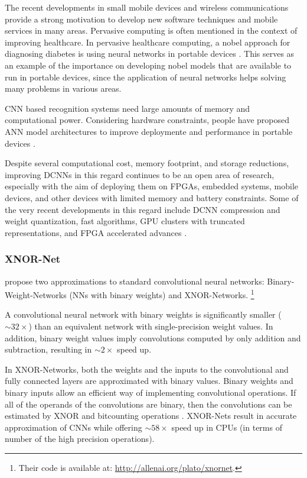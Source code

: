 The recent developments in small mobile devices and wireless communications
provide a strong motivation to develop new software techniques and mobile
services in many areas. Pervasive computing is often mentioned in the
context of improving healthcare. In pervasive healthcare computing, a nobel
approach for diagnosing diabetes is using neural networks in portable devices
\citep{Karan2012}. This serves as an example of the importance on developing
nobel models that are available to run in portable devices, since the
application of neural networks helps solving many problems in various areas.

CNN based recognition systems need large amounts of memory and computational
power. Considering hardware constraints, people have proposed ANN model
architectures to improve deploymente and performance in portable devices
\citep{Rastegari2016, Wu2016, Kim2015}.

{\color{Orchid}
Despite several computational cost, memory footprint, and
storage reductions, improving DCNNs in this regard continues to be an open
area of research, especially with the aim of deploying them on FPGAs,
embedded systems, mobile devices, and other devices with limited memory and
battery constraints. Some of the very recent developments in this regard
include DCNN compression and weight quantization, fast algorithms, GPU
clusters with truncated representations, and FPGA accelerated advances
\citep{Waseem2017}.}


\subsubsection{XNOR-Net}

\cite{Rastegari2016} propose two approximations to standard convolutional
neural networks: Binary-Weight-Networks (NNs with binary weights) and
XNOR-Networks. \footnote{Their code is available at:
\url{http://allenai.org/plato/xnornet}.}

A convolutional neural network with binary weights is
significantly smaller ($\sim 32 \times$) than an equivalent network
with single-precision weight values. In addition, binary weight values imply
convolutions computed by only addition and subtraction, resulting in $\sim
2 \times$ speed up.

In XNOR-Networks, both the weights and the inputs to the convolutional
and fully connected layers are approximated with binary values. Binary
weights and binary inputs allow an efficient way of implementing
convolutional operations. If all of the operands of the convolutions are
binary, then the convolutions can be estimated by XNOR and bitcounting
operations \citep{Courbariaux2016}. XNOR-Nets result in accurate
approximation of CNNs while offering $\sim 58 \times$ speed up in CPUs
(in terms of number of the high precision operations).

